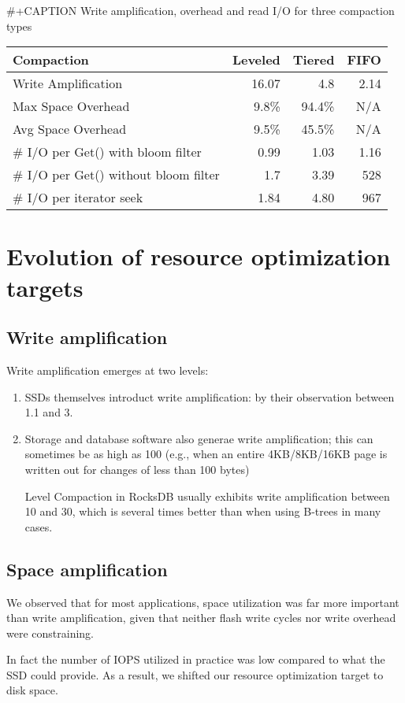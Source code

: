 \documentclass[11pt]{article}
\begin{document}
\#+CAPTION Write amplification, overhead and read I/O for three compaction types
\begin{center}
\begin{tabular}{lrrr}
\hline
Compaction & Leveled & Tiered & FIFO\\
\hline
Write Amplification & 16.07 & 4.8 & 2.14\\
Max Space Overhead & 9.8\% & 94.4\% & N/A\\
Avg Space Overhead & 9.5\% & 45.5\% & N/A\\
\# I/O per Get() with bloom filter & 0.99 & 1.03 & 1.16\\
\# I/O per Get() without bloom filter & 1.7 & 3.39 & 528\\
\# I/O per iterator seek & 1.84 & 4.80 & 967\\
\hline
\end{tabular}
\end{center}
\section{Evolution of resource optimization targets}
\label{sec:org19a3a20}
\subsection{Write amplification}
\label{sec:org3d2bfda}
Write amplification emerges at two levels:
\begin{enumerate}
\item SSDs themselves introduct write amplification: by their observation between 1.1 and 3.
\item Storage and database software also generae write amplification; this can sometimes be as high as
100 (e.g., when an entire 4KB/8KB/16KB page is written out for changes of less than 100 bytes)

Level Compaction in RocksDB usually exhibits write amplification between 10 and 30, which is
several times better than when using B-trees in many cases.
\end{enumerate}
\subsection{Space amplification}
\label{sec:org400aeb8}
We observed that for most applications, space utilization was far more important than write
amplification, given that neither flash write cycles nor write overhead were constraining.

In fact the number of IOPS utilized in practice was low compared to what the SSD could provide. As a
result, we shifted our resource optimization target to disk space.
\end{document}
